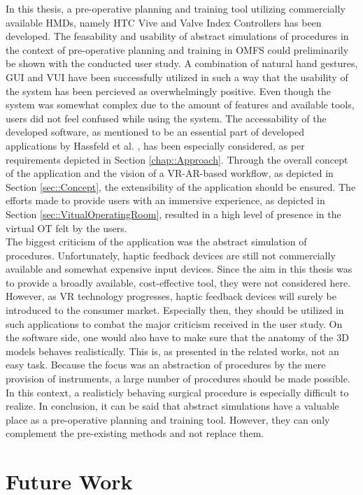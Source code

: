 In this thesis, a pre-operative planning and training tool utilizing
commercially available HMDs, namely HTC Vive and Valve Index Controllers
has been developed. The feasability and usability of 
abstract simulations of procedures in the context of pre-operative planning
and training in OMFS could preliminarily be shown with the 
conducted user study. 
A combination of natural hand gestures, GUI and VUI have been
successfully utilized in such a way that the usability
of the system has been percieved as overwhelmingly positive.
Even though the system was somewhat complex due to the amount of features 
and available tools, users did not feel confused while using the 
system.
The accessability of the developed software, 
as mentioned to be an essential part of developed applications by
Hassfeld et al. \cite{HASSFELD20012}, has been especially considered,
as per requirements depicted in Section \ref{chap::Approach}.
Through the overall concept of the application and the vision of a VR-AR-based workflow, as depicted in Section 
\ref{sec::Concept}, the extensibility of the application should be ensured. 
The efforts made to provide users with an immersive experience,
as depicted in Section \ref{sec::VitualOperatingRoom},
resulted in a high level of presence in the virtual OT felt by the users.
\\ The biggest criticism of the application was the abstract 
simulation of procedures. Unfortunately, haptic feedback devices are still
not commercially available and somewhat expensive input devices. Since
the aim in this thesis was to provide a broadly available, cost-effective
tool, they were not considered here. However, as VR technology progresses,
haptic feedback devices will surely be introduced to the consumer market.
Especially then, they should be utilized in such applications to combat
the major criticism received in the user study.
On the software side, one would also have to make sure that 
the anatomy of the 3D models behaves realistically. This is, as 
presented in the related works, not an easy task. 
Because the focus was an abstraction of procedures by the mere provision 
of instruments, a large number of procedures should be made possible.
In this context, a realisticly behaving surgical procedure is
especially difficult to realize.
In conclusion, it can be said that abstract simulations have a valuable
place as a pre-operative planning and training tool. However, they 
can only complement the pre-existing methods and not replace them.
 
\section{Future Work}






